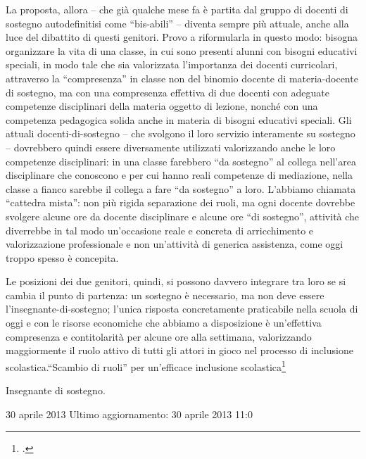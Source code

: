La proposta, allora – che già qualche mese fa è partita dal gruppo di docenti di sostegno autodefinitisi come “bis-abili” – diventa sempre più attuale, anche alla luce del dibattito di questi genitori.
Provo a riformularla in questo modo: bisogna organizzare la vita di una classe, in cui sono presenti alunni con bisogni educativi speciali, in modo tale che sia valorizzata l'importanza dei docenti curricolari, attraverso la “compresenza” in classe non del binomio docente di materia-docente di sostegno, ma con una compresenza effettiva di due docenti con adeguate competenze disciplinari della materia oggetto di lezione, nonché con una competenza pedagogica solida anche in materia di bisogni educativi speciali.
Gli attuali docenti-di-sostegno – che svolgono il loro servizio interamente su sostegno – dovrebbero quindi essere diversamente utilizzati valorizzando anche le loro competenze disciplinari: in una classe farebbero “da sostegno” al collega nell'area disciplinare che conoscono e per cui hanno reali competenze di mediazione, nella classe a fianco sarebbe il collega a fare “da sostegno” a loro.
L'abbiamo chiamata “cattedra mista”: non più rigida separazione dei ruoli, ma ogni docente dovrebbe svolgere alcune ore da docente disciplinare e alcune ore “di sostegno”, attività che diverrebbe in tal modo un'occasione reale e concreta di arricchimento e valorizzazione professionale e non un'attività di generica assistenza, come oggi troppo spesso è concepita.

Le posizioni dei due genitori, quindi, si possono davvero integrare tra loro se si cambia il punto di partenza: un sostegno è necessario, ma non deve essere l'insegnante-di-sostegno; l'unica risposta concretamente praticabile nella scuola di oggi e con le risorse economiche che abbiamo a disposizione è un'effettiva compresenza e contitolarità per alcune ore alla settimana, valorizzando maggiormente il ruolo attivo di tutti gli attori in gioco nel processo di inclusione scolastica.“Scambio di ruoli” per un'efficace inclusione scolastica\footcite{Giani2013a}

Insegnante di sostegno.

30 aprile 2013
Ultimo aggiornamento: 30 aprile 2013 11:0